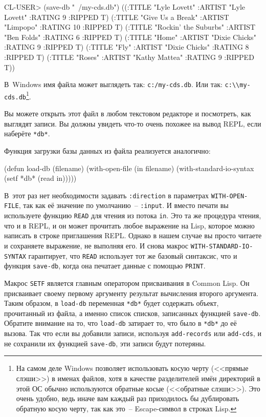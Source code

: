 \begin{myverb}
CL-USER> (save-db "~/my-cds.db")
((:TITLE "Lyle Lovett" :ARTIST "Lyle Lovett" :RATING 9 :RIPPED T)
 (:TITLE "Give Us a Break" :ARTIST "Limpopo" :RATING 10 :RIPPED T)
 (:TITLE "Rockin' the Suburbs" :ARTIST "Ben Folds" :RATING 6 :RIPPED T)
 (:TITLE "Home" :ARTIST "Dixie Chicks" :RATING 9 :RIPPED T)
 (:TITLE "Fly" :ARTIST "Dixie Chicks" :RATING 8 :RIPPED T)
 (:TITLE "Roses" :ARTIST "Kathy Mattea" :RATING 9 :RIPPED T))
\end{myverb}

В~Windows имя файла может выглядеть так: \lstinline!c:/my-cds.db!. Или так:
\lstinline!c:\\my-cds.db!\footnote{На самом деле Windows позволяет использовать косую
  черту (<<прямые слэши>>) в именах файлов, хотя в качестве разделителей имён директорий в
  этой ОС обычно используются обратные косые (<<обратные слэши>>). Это очень удобно, ведь
  иначе вам каждый раз приходилось бы дублировать обратную косую черту, так как это~--
  Escape-символ в строках Lisp.}.

Вы можете открыть этот файл в любом текстовом редакторе и посмотреть, как выглядят
записи. Вы должны увидеть что-то очень похожее на вывод REPL, если наберёте \lstinline{*db*}.

Функция загрузки базы данных из файла реализуется аналогично:

\begin{myverb}
(defun load-db (filename)
  (with-open-file (in filename)
    (with-standard-io-syntax
      (setf *db* (read in)))))
\end{myverb}

В~этот раз нет необходимости задавать \lstinline{:direction} в параметрах
\lstinline{WITH-OPEN-FILE}, так как её значение по умолчанию~-- \lstinline{:input}. И вместо
печати вы используете функцию \lstinline{READ} для чтения из потока \lstinline{in}. Это та же
процедура чтения, что и в REPL, и он может прочитать любое выражение на Lisp, которое
можно написать в строке приглашения REPL. Однако в нашем случае вы просто читаете и
сохраняете выражение, не выполняя его. И снова макрос \lstinline{WITH-STANDARD-IO-SYNTAX}
гарантирует, что \lstinline{READ} использует тот же базовый синтаксис, что и функция
\lstinline{save-db}, когда она печатает данные с помощью \lstinline{PRINT}.

Макрос \lstinline{SETF} является главным оператором присваивания в Common Lisp. Он
присваивает своему первому аргументу результат вычисления второго аргумента. Таким образом,
в \lstinline{load-db} переменная \lstinline{*db*} будет содержать объект, прочитанный из файла, а
именно список списков, записанных функцией \lstinline{save-db}. Обратите внимание на то, что
\lstinline{load-db} затирает то, что было в \lstinline{*db*} до её вызова. Так что если вы добавили
записи, используя \lstinline{add-records} или \lstinline{add-cds}, и не сохранили их функцией
\lstinline{save-db}, эти записи будут потеряны.

